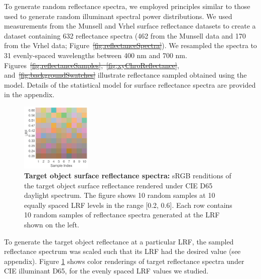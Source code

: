 \documentclass{jov}
\providecommand{\DIFaddtex}[1]{{\protect\color{blue}\uwave{#1}}} %
\providecommand{\DIFdeltex}[1]{{\protect\color{red}\sout{#1}}}                      %
\providecommand{\DIFaddbegin}{} %
\providecommand{\DIFaddend}{} %
\providecommand{\DIFdelbegin}{} %
\providecommand{\DIFdelend}{} %
\providecommand{\DIFaddbeginFL}{} %
\providecommand{\DIFaddendFL}{} %
\providecommand{\DIFdelbeginFL}{} %
\providecommand{\DIFdelendFL}{} %
\providecommand{\DIFadd}[1]{\texorpdfstring{\DIFaddtex{#1}}{#1}} %
\providecommand{\DIFdel}[1]{\texorpdfstring{\DIFdeltex{#1}}{}} %
\newcommand{\DIFscaledelfig}{0.5}
\newlength{\DIFdelgraphicswidth} %
\newlength{\DIFdelgraphicsheight} %
\newcommand{\DIFaddincludegraphics}[2][]{{\color{blue}\fbox{\DIFOincludegraphics[#1]{#2}}}} %
\newcommand{\DIFdelincludegraphics}[2][]{%
\sbox{\DIFdelgraphicsbox}{\DIFOincludegraphics[#1]{#2}}%
\settoboxwidth{\DIFdelgraphicswidth}{\DIFdelgraphicsbox} %
\settoboxtotalheight{\DIFdelgraphicsheight}{\DIFdelgraphicsbox} %
\scalebox{\DIFscaledelfig}{%
\parbox[b]{\DIFdelgraphicswidth}{\usebox{\DIFdelgraphicsbox}\\[-\baselineskip] \rule{\DIFdelgraphicswidth}{0em}}\llap{\resizebox{\DIFdelgraphicswidth}{\DIFdelgraphicsheight}{%
\setlength{\unitlength}{\DIFdelgraphicswidth}%
\begin{picture}(1,1)%
\thicklines\linethickness{2pt} %
{\color[rgb]{1,0,0}\put(0,0){\framebox(1,1){}}}%
{\color[rgb]{1,0,0}\put(0,0){\line( 1,1){1}}}%
{\color[rgb]{1,0,0}\put(0,1){\line(1,-1){1}}}%
\end{picture}%
}\hspace*{3pt}}} %
} %
\DeclareRobustCommand{\DIFaddbegin}{\DIFOaddbegin \let\includegraphics\DIFaddincludegraphics} %
\DeclareRobustCommand{\DIFaddend}{\DIFOaddend \let\includegraphics\DIFOincludegraphics} %
\DeclareRobustCommand{\DIFdelbegin}{\DIFOdelbegin \let\includegraphics\DIFdelincludegraphics} %
\DeclareRobustCommand{\DIFdelend}{\DIFOaddend \let\includegraphics\DIFOincludegraphics} %
\DeclareRobustCommand{\DIFaddbeginFL}{\DIFOaddbeginFL \let\includegraphics\DIFaddincludegraphics} %
\DeclareRobustCommand{\DIFaddendFL}{\DIFOaddendFL \let\includegraphics\DIFOincludegraphics} %
\DeclareRobustCommand{\DIFdelbeginFL}{\DIFOdelbeginFL \let\includegraphics\DIFdelincludegraphics} %
\DeclareRobustCommand{\DIFdelendFL}{\DIFOaddendFL \let\includegraphics\DIFOincludegraphics} %
\begin{document}
To generate random reflectance spectra, we employed principles similar to those used to generate random illuminant spectral power distributions.
We used measurements from the Munsell \cite{kelly1943tristimulus} and Vrhel \cite{vrhel1994measurement} surface reflectance datasets to create a dataset containing 632 reflectance spectra (462 from the Munsell data and 170 from the Vrhel data; Figure~\DIFdelbegin \DIFdel{\ref{fig:reflectanceSpectra}}\DIFdelend \DIFaddbegin \DIFadd{\ref{fig:surfaceReflectanceGeneration}a}\DIFaddend ).
We resampled the spectra to 31 evenly-spaced wavelengths between 400 nm and 700 nm.
Figures~\DIFdelbegin \DIFdel{\ref{fig:reflectanceSamples},~\ref{fig:xyChroReflectance}}\DIFdelend \DIFaddbegin \DIFadd{\ref{fig:surfaceReflectanceGeneration}b,~\ref{fig:surfaceReflectanceGeneration}c}\DIFaddend , and~\DIFdelbegin \DIFdel{\ref{fig:backgroundSwatches} }\DIFdelend \DIFaddbegin \DIFadd{\ref{fig:surfaceReflectanceGeneration}d }\DIFaddend illustrate reflectance sampled obtained using the model. 
Details of the statistical model for surface reflectance spectra are provided in the appendix. 

\begin{figure}
\centering
\DIFdelbeginFL %
\DIFdelendFL \DIFaddbeginFL \includegraphics[width=0.3\textwidth]{Figure8.eps}
\DIFaddendFL \caption{{\bf Target object surface reflectance spectra:} sRGB renditions of the target object surface reflectance rendered under CIE D65 daylight spectrum. The figure shows 10 random samples at 10 equally spaced LRF levels in the range [0.2, 0.6]. Each row contains 10 random samples of reflectance spectra generated at the LRF shown on the left.}
\label{fig:targetSwatches}
\end{figure}

To generate the target object reflectance at a particular LRF, the sampled reflectance spectrum was 
scaled such that its LRF had the desired value (see appendix).
Figure \ref{fig:targetSwatches} shows color renderings of target reflectance spectra under CIE illuminant D65, for the evenly spaced LRF values we studied.
\end{document}
